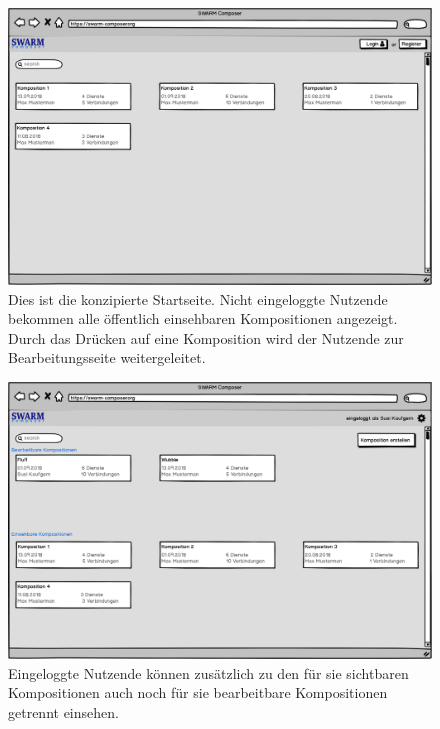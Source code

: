 \begin{figure}[h]
	\centering
	\includegraphics[width=\textwidth]{img/kompositionen}
	\caption{
            Dies ist die konzipierte Startseite. Nicht eingeloggte Nutzende bekommen alle
            öffentlich einsehbaren Kompositionen angezeigt. Durch das Drücken
            auf eine Komposition wird der Nutzende zur Bearbeitungsseite weitergeleitet.
        }
	\label{fig:kompositionen}
\end{figure}

\begin{figure}[h]
	\centering
	\includegraphics[width=\textwidth]{img/kompositionen_eingeloggt}
	\caption{
          Eingeloggte Nutzende können zusätzlich zu den für sie sichtbaren Kompositionen
          auch noch für sie bearbeitbare Kompositionen getrennt einsehen.
        }
	\label{fig:kompositionen-eingeloggt}
\end{figure}


